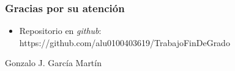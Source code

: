 \begin{frame} [fragile]
  \frametitle{Gracias por su atención}
  \block{\SchollApp}
    \begin{itemize}
    \item Repositorio en {\it github}: https://github.com/alu0100403619/TrabajoFinDeGrado
    \end{itemize}
    \begin{flushright}
    Gonzalo J. García Martín  \\
    \end{flushright}
  \endblock{}
\end{frame}
